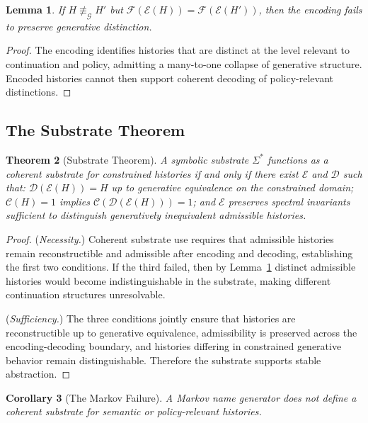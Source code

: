 \documentclass[12pt, a4paper]{article}
\theoremstyle{plain}
\newtheorem{theorem}{Theorem}[section]
\newtheorem{lemma}[theorem]{Lemma}
\newtheorem{corollary}[theorem]{Corollary}
\theoremstyle{definition}
\theoremstyle{remark}
\begin{document}
\begin{lemma}
\label{lem:spectral}
If $H \not\equiv_{\mathcal{G}} H'$ but $\mathcal{F}(\mathcal{E}(H)) = \mathcal{F}(\mathcal{E}(H'))$, then the encoding fails to preserve generative distinction.
\end{lemma}

\begin{proof}
The encoding identifies histories that are distinct at the level relevant to continuation and policy, admitting a many-to-one collapse of generative structure. Encoded histories cannot then support coherent decoding of policy-relevant distinctions.
\end{proof}

\subsection{The Substrate Theorem}

\begin{theorem}[Substrate Theorem]
\label{thm:substrate}
A symbolic substrate $\Sigma^*$ functions as a coherent substrate for constrained histories if and only if there exist $\mathcal{E}$ and $\mathcal{D}$ such that: $\mathcal{D}(\mathcal{E}(H)) = H$ up to generative equivalence on the constrained domain; $\mathcal{C}(H) = 1$ implies $\mathcal{C}(\mathcal{D}(\mathcal{E}(H))) = 1$; and $\mathcal{E}$ preserves spectral invariants sufficient to distinguish generatively inequivalent admissible histories.
\end{theorem}

\begin{proof}
(\textit{Necessity.}) Coherent substrate use requires that admissible histories remain reconstructible and admissible after encoding and decoding, establishing the first two conditions. If the third failed, then by Lemma~\ref{lem:spectral} distinct admissible histories would become indistinguishable in the substrate, making different continuation structures unresolvable.

(\textit{Sufficiency.}) The three conditions jointly ensure that histories are reconstructible up to generative equivalence, admissibility is preserved across the encoding-decoding boundary, and histories differing in constrained generative behavior remain distinguishable. Therefore the substrate supports stable abstraction.
\end{proof}

\begin{corollary}[The Markov Failure]
A Markov name generator does not define a coherent substrate for semantic or policy-relevant histories.
\end{corollary}
\end{document}
